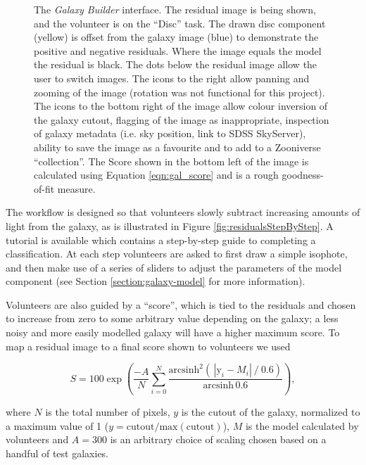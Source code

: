 \documentclass[../main.tex]{subfiles}
\begin{document}
\begin{figure}
  \caption{The \textit{Galaxy Builder} interface. The residual image is being shown, and the volunteer is on the ``Disc'' task. The drawn disc component (yellow) is offset from the galaxy image (blue) to demonstrate the positive and negative residuals. Where the image equals the model the residual is black. The dots below the residual image allow the user to switch images. The icons to the right allow panning and zooming of the image (rotation was not functional for this project). The icons to the bottom right of the image allow colour inversion of the galaxy cutout, flagging of the image as inappropriate, inspection of galaxy metadata (i.e. sky position, link to SDSS SkyServer), ability to save the image as a favourite and to add to a Zooniverse ``collection''. The Score shown in the bottom left of the image is calculated using Equation \ref{eqn:gal_score} and is a rough goodness-of-fit measure.}
  \label{fig:interfaceInProgress}
\end{figure}


The workflow is designed so that volunteers slowly subtract increasing amounts of light from the galaxy, as is illustrated in Figure \ref{fig:residualsStepByStep}. A tutorial is available which contains a step-by-step guide to completing a classification. At each step volunteers are asked to first draw a simple isophote, and then make use of a series of sliders to adjust the parameters of the model component (see Section \ref{section:galaxy-model} for more information).

Volunteers are also guided by a ``score'', which is tied to the residuals and chosen to increase from zero to some arbitrary value depending on the galaxy; a less noisy and more easily modelled galaxy will have a higher maximum score. To map a residual image to a final score shown to volunteers we used

\begin{equation}
  \label{eqn:gal_score}
    S = 100 \exp\left(\frac{-A}{N}\sum_{i=0}^N\frac{\text{arcsinh}^2\left(\,|\text{y}_i - M_i|\ /\ 0.6\right)}{\text{arcsinh}\,0.6 }\right),
\end{equation}

where $N$ is the total number of pixels, $y$ is the cutout of the galaxy, normalized to a maximum value of 1 ($y = \text{cutout}/\text{max}(\text{cutout})$), $M$ is the model calculated by volunteers and $A=300$ is an arbitrary choice of scaling chosen based on a handful of test galaxies.
\end{document}

